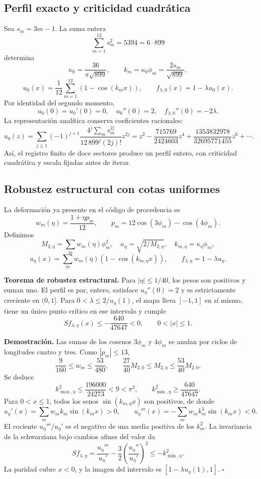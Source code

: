\subsection{Perfil exacto y criticidad cuadrática}
\label{hmtfg:desarrollo:2}

Sea \(s_m=3m-1\). La suma entera
\[
\sum_{m=1}^{12}s_m^2=5394=6\cdot899
\]
determina
\[
\kappa_0=\frac{36}{\pi\sqrt{899}},\qquad
k_m=\kappa_0\phi_m=\frac{2s_m}{\sqrt{899}},
\]
\[
u_0(x)=\frac1{12}\sum_{m=1}^{12}(1-\cos(k_mx)),\qquad
f_{\lambda,0}(x)=1-\lambda u_0(x).
\]
Por identidad del segundo momento,
\[
u_0(0)=u_0'(0)=0,\quad u_0''(0)=2,\quad
f_{\lambda,0}''(0)=-2\lambda.
\]
La representación analítica conserva coeficientes racionales:
\[
u_0(z)=\sum_{j\ge1}(-1)^{j+1}
\frac{4^j\sum_m s_m^{2j}}{12\,899^j(2j)!}z^{2j}
=z^2-\frac{715769}{2424603}z^4
+\frac{1353832978}{32695771455}z^6+\cdots.
\]
Así, el registro finito de doce sectores produce un perfil entero, con criticidad cuadrática y escala fijadas antes de iterar.


\subsection{Robustez estructural con cotas uniformes}
\label{hmtfg:desarrollo:3}

La deformación ya presente en el código de procedencia es
\[
w_m(\eta)=\frac{1+\eta p_m}{12},\qquad
p_m=12\cos(3\phi_m)-\cos(4\phi_m).
\]
Definimos
\[
M_{2,\eta}=\sum_mw_m(\eta)\phi_m^2,\quad
\kappa_\eta=\sqrt{2/M_{2,\eta}},\quad k_{m,\eta}=\kappa_\eta\phi_m,
\]
\[
u_\eta(x)=\sum_mw_m(\eta)(1-\cos(k_{m,\eta}x)),\qquad
f_{\lambda,\eta}=1-\lambda u_\eta.
\]

\textbf{Teorema de robustez estructural.} Para \(|\eta|\le1/40\), los pesos son positivos y suman uno. El perfil es par, entero, satisface \(u_\eta''(0)=2\) y es estrictamente creciente en \((0,1]\). Para \(0<\lambda\le2/u_\eta(1)\), el mapa lleva \([-1,1]\) en sí mismo, tiene un único punto crítico en ese intervalo y cumple
\[
S f_{\lambda,\eta}(x)\le-\frac{640}{47647}<0,\qquad0<|x|\le1.
\]

\textbf{Demostración.} Las sumas de los cosenos \(3\phi_m\) y \(4\phi_m\) se anulan por ciclos de longitudes cuatro y tres. Como \(|p_m|\le13\),
\[
\frac9{160}\le w_m\le\frac{53}{480},\qquad
\frac{27}{40}M_{2,0}\le M_{2,\eta}\le\frac{53}{40}M_{2,0}.
\]
Se deduce
\[
k_{\max,\eta}^2\le\frac{196000}{24273}<9<\pi^2,\qquad
k_{\min,\eta}^2\ge\frac{640}{47647}.
\]
Para \(0<x\le1\), todos los senos \(\sin(k_{m,\eta}x)\) son positivos, de donde
\[
u_\eta'(x)=\sum_mw_mk_m\sin(k_mx)>0,\qquad
u_\eta'''(x)=-\sum_mw_mk_m^3\sin(k_mx)<0.
\]
El cociente \(u_\eta'''/u_\eta'\) es el negativo de una media positiva de los \(k_m^2\). La invariancia de la schwarziana bajo cambios afines del valor da
\[
S f_{\lambda,\eta}
=\frac{u_\eta'''}{u_\eta'}-\frac32
\left(\frac{u_\eta''}{u_\eta'}\right)^2
\le-k_{\min,\eta}^2.
\]
La paridad cubre \(x<0\), y la imagen del intervalo es
\([1-\lambda u_\eta(1),1]\). \(\square\)

